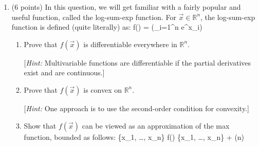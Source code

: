 \begin{enumerate}[resume]
\pagebreak
\item
(6 points) In this question, we will get familiar with a fairly popular and useful function, called the log-sum-exp function. For $\vec{x} \in \mathbb{R}^n$, the log-sum-exp function is defined (quite literally) as:
\beqn
f() = \log\bigg(\sum_{i=1}^n e^{x_i}\bigg)
\eeqn
\begin{enumerate}
\item Prove that $f(\vec{x})$ is differentiable everywhere in $\mathbb{R}^n$.

[\emph{Hint:} Multivariable functions are differentiable if the partial derivatives exist and are continuous.]
\pagebreak
\item Prove that $f(\vec{x})$ is convex on $\mathbb{R}^n$.

[\emph{Hint:} One approach is to use the second-order condition for convexity.]
\pagebreak
\item Show that $f(\vec{x})$ can be viewed as an approximation of the max function, bounded as follows:
\beqn
\max\{x_1, \dots, x_n\} \le f() \le \max\{x_1, \dots, x_n\} + \log(n)
\eeqn
\end{enumerate}
\end{enumerate}

